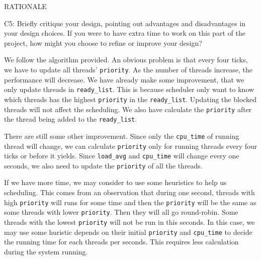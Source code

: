 \begin{aspect}{RATIONALE}
  \begin{qc}
    C5: Briefly critique your design, pointing out advantages and disadvantages in your design choices.  If you were to have extra time to work on this part of the project, how might you choose to refine or improve your design?
  \end{qc}
  We follow the algorithm provided. An obvious problem is that every four ticks, we have to update all threads' \lstinline{priority}. As the number of threads increase, the performance will decrease. We have already make some improvement, that we only update threads in \lstinline{ready_list}. This is because scheduler only want to know which threads has the highest \lstinline{priority} in the \lstinline{ready_list}. Updating the blocked threads will not affect the scheduling. We also have calculate the \lstinline{priority} after the thread being added to the \lstinline{ready_list}.

  There are still some other improvement. Since only the \lstinline{cpu_time} of running thread will change, we can calculate \lstinline{priority} only for running threads every four ticks or before it yields. Since \lstinline{load_avg} and \lstinline{cpu_time} will change every one seconds, we also need to update the \lstinline{priority} of all the threads.

  If we have more time, we may consider to use some heuristics to help us scheduling. This comes from an observation that during one second, threads with high \lstinline{priority} will runs for some time and then the \lstinline{priority} will be the same as some threads with lower \lstinline{priority}. Then they will all go round-robin. Some threads with the lowest \lstinline{priority} will not be run in this seconds. In this case, we may use some huristic depends on their initial \lstinline{priority} and \lstinline{cpu_time} to decide the running time for each threads per seconds. This requires less calculation during the system running.


\end{aspect}
